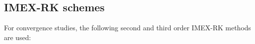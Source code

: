\documentclass[final,11pt]{siamart251216}
\numberwithin{equation}{section}
\theoremstyle{definition}
\theoremstyle{remark}
\begin{document}
\subsection{IMEX-RK schemes}\label{IMEXtabs}
For convergence studies, the following second and third order IMEX-RK methods are used: 
\end{document}
